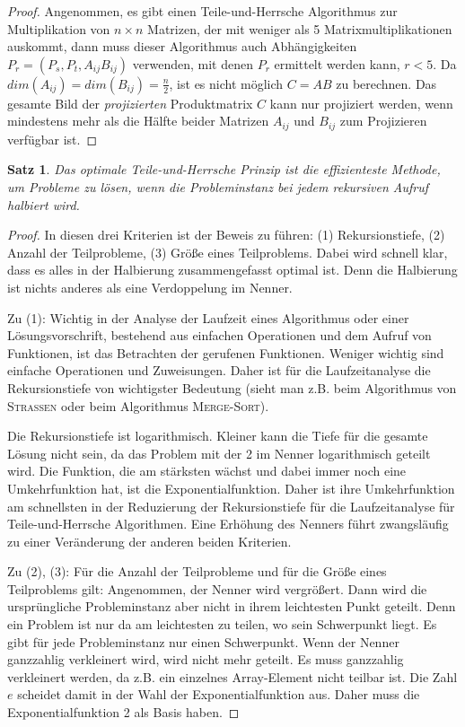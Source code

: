 \documentclass{scrartcl}
\newtheorem{satz}{Satz}[section]
\numberwithin{equation}{section}
\begin{document}
\begin{proof}
	Angenommen, es gibt einen Teile-und-Herrsche Algorithmus zur Multiplikation von $n \times n$ Matrizen, der mit weniger als 5 Matrixmultiplikationen auskommt, dann muss dieser Algorithmus auch Abhängigkeiten $P_r = (P_s, P_t, A_{ij}B_{ij})$ verwenden, mit denen $P_r$ ermittelt werden kann, $r < 5$. Da $dim(A_{ij}) = dim(B_{ij}) = \frac{n}{2}$, ist es nicht möglich $C = AB$ zu berechnen. Das gesamte Bild der \textit{projizierten} Produktmatrix $C$ kann nur projiziert werden, wenn mindestens mehr als die Hälfte beider Matrizen $A_{ij}$ und $B_{ij}$ zum Projizieren verfügbar ist.
\end{proof}
\begin{satz}
	Das optimale Teile-und-Herrsche Prinzip ist die effizienteste Methode, um Probleme zu lösen, wenn die Probleminstanz bei jedem rekursiven Aufruf halbiert wird. 
\end{satz}
\begin{proof}
	In diesen drei Kriterien ist der Beweis zu führen: (1) Rekursionstiefe, (2) Anzahl der Teilprobleme, (3) Größe eines Teilproblems. Dabei wird schnell klar, dass es alles in der Halbierung zusammengefasst optimal ist. Denn die Halbierung ist nichts anderes als eine Verdoppelung im Nenner.
	
	Zu (1): Wichtig in der Analyse der Laufzeit eines Algorithmus oder einer Lösungsvorschrift, bestehend aus einfachen Operationen und dem Aufruf von Funktionen, ist das Betrachten der gerufenen Funktionen. Weniger wichtig sind einfache Operationen und Zuweisungen. Daher ist für die Laufzeitanalyse die Rekursionstiefe von wichtigster Bedeutung (sieht man z.B. beim Algorithmus von \textsc{Strassen} oder beim Algorithmus \textsc{Merge-Sort}).
	
	Die Rekursionstiefe ist logarithmisch. Kleiner kann die Tiefe für die gesamte Lösung nicht sein, da das Problem mit der 2 im Nenner logarithmisch geteilt wird. Die Funktion, die am stärksten wächst und dabei immer noch eine Umkehrfunktion hat, ist die Exponentialfunktion. Daher ist ihre Umkehrfunktion am schnellsten in der Reduzierung der Rekursionstiefe für die Laufzeitanalyse für Teile-und-Herrsche Algorithmen. Eine Erhöhung des Nenners führt zwangsläufig zu einer Veränderung der anderen beiden Kriterien.
	
	Zu (2), (3): Für die Anzahl der Teilprobleme und für die Größe eines Teilproblems gilt: Angenommen, der Nenner wird vergrößert. Dann wird die ursprüngliche Probleminstanz aber nicht in ihrem leichtesten Punkt geteilt. Denn ein Problem ist nur da am leichtesten zu teilen, wo sein Schwerpunkt liegt. Es gibt für jede Probleminstanz nur einen Schwerpunkt. Wenn der Nenner ganzzahlig verkleinert wird, wird nicht mehr geteilt. Es muss ganzzahlig verkleinert werden, da z.B. ein einzelnes Array-Element nicht teilbar ist. Die Zahl $e$ scheidet damit in der Wahl der Exponentialfunktion aus. Daher muss die Exponentialfunktion 2 als Basis haben.
\end{proof}
\end{document}
